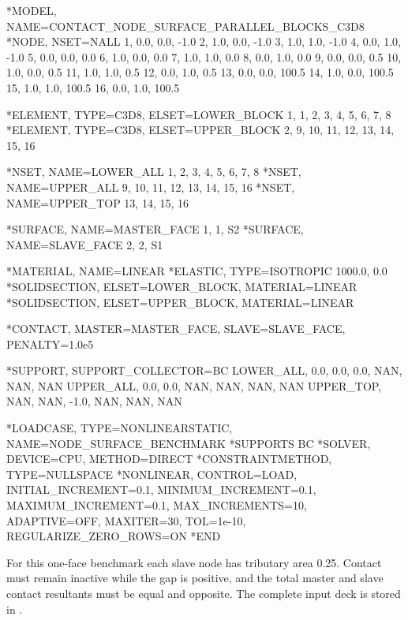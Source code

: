 \begin{exampledeck}
*MODEL, NAME=CONTACT_NODE_SURFACE_PARALLEL_BLOCKS_C3D8
*NODE, NSET=NALL
1,  0.0, 0.0,  -1.0
2,  1.0, 0.0,  -1.0
3,  1.0, 1.0,  -1.0
4,  0.0, 1.0,  -1.0
5,  0.0, 0.0,   0.0
6,  1.0, 0.0,   0.0
7,  1.0, 1.0,   0.0
8,  0.0, 1.0,   0.0
9,  0.0, 0.0,   0.5
10, 1.0, 0.0,   0.5
11, 1.0, 1.0,   0.5
12, 0.0, 1.0,   0.5
13, 0.0, 0.0, 100.5
14, 1.0, 0.0, 100.5
15, 1.0, 1.0, 100.5
16, 0.0, 1.0, 100.5

*ELEMENT, TYPE=C3D8, ELSET=LOWER_BLOCK
1, 1, 2, 3, 4, 5, 6, 7, 8
*ELEMENT, TYPE=C3D8, ELSET=UPPER_BLOCK
2, 9, 10, 11, 12, 13, 14, 15, 16

*NSET, NAME=LOWER_ALL
1, 2, 3, 4, 5, 6, 7, 8
*NSET, NAME=UPPER_ALL
9, 10, 11, 12, 13, 14, 15, 16
*NSET, NAME=UPPER_TOP
13, 14, 15, 16

*SURFACE, NAME=MASTER_FACE
1, 1, S2
*SURFACE, NAME=SLAVE_FACE
2, 2, S1

*MATERIAL, NAME=LINEAR
*ELASTIC, TYPE=ISOTROPIC
1000.0, 0.0
*SOLIDSECTION, ELSET=LOWER_BLOCK, MATERIAL=LINEAR
*SOLIDSECTION, ELSET=UPPER_BLOCK, MATERIAL=LINEAR

*CONTACT, MASTER=MASTER_FACE, SLAVE=SLAVE_FACE, PENALTY=1.0e5

*SUPPORT, SUPPORT_COLLECTOR=BC
LOWER_ALL, 0.0, 0.0, 0.0, NAN, NAN, NAN
UPPER_ALL, 0.0, 0.0, NAN, NAN, NAN, NAN
UPPER_TOP, NAN, NAN, -1.0, NAN, NAN, NAN

*LOADCASE, TYPE=NONLINEARSTATIC, NAME=NODE_SURFACE_BENCHMARK
*SUPPORTS
BC
*SOLVER, DEVICE=CPU, METHOD=DIRECT
*CONSTRAINTMETHOD, TYPE=NULLSPACE
*NONLINEAR, CONTROL=LOAD, INITIAL_INCREMENT=0.1, MINIMUM_INCREMENT=0.1, MAXIMUM_INCREMENT=0.1, MAX_INCREMENTS=10, ADAPTIVE=OFF, MAXITER=30, TOL=1e-10, REGULARIZE_ZERO_ROWS=ON
*END
\end{exampledeck}

For this one-face benchmark each slave node has tributary area 0.25. Contact must remain inactive while the gap is positive, and the total master and slave contact resultants must be equal and opposite. The complete input deck is stored in .
